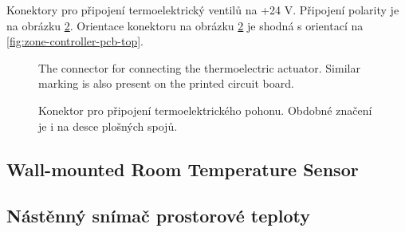 \begin{Czech}
Konektory pro připojení termoelektrický ventilů na +24 V. Připojení polarity je na obrázku \ref{fig:zone-controller-terminal-block}. Orientace konektoru na obrázku \ref{fig:zone-controller-terminal-block} je shodná s orientací na \ref{fig:zone-controller-pcb-top}.
\end{Czech}


\begin{English}
\begin{figure}[H]
    \centering
    \def\svgwidth{0.15\columnwidth}
    \graphicspath{{pictures/all/hardware/svg/}}
    
    \caption{The connector for connecting the thermoelectric actuator. Similar marking is also present on the printed circuit board.}
    \label{fig:zone-controller-terminal-block}
\end{figure}
\end{English}

\begin{Czech}
\begin{figure}[H]
    \centering
    \def\svgwidth{0.15\columnwidth}
    \graphicspath{{pictures/all/hardware/svg/}}
    
    \caption{Konektor pro připojení termoelektrického pohonu. Obdobné značení je i na desce plošných spojů.}
    \label{fig:zone-controller-terminal-block}
\end{figure}
\end{Czech}


\newpage
\begin{English}
\subsection{Wall-mounted Room Temperature Sensor}
\end{English}

\begin{Czech}
\subsection{Nástěnný snímač prostorové teploty}
\end{Czech}


